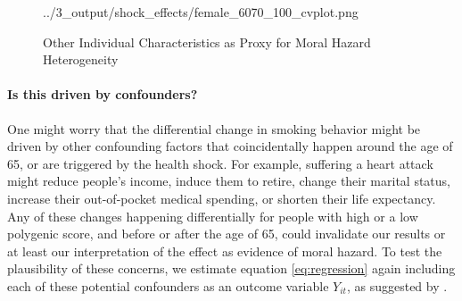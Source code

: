 \documentclass[11pt]{article}
\begin{document}
\begin{figure}[ht]
\begin{center}
{		{../3_output/shock_effects/female_6070_100_cvplot.png}
		}
		\caption{Other Individual Characteristics as Proxy for Moral Hazard Heterogeneity
					\label{fig:otherX}}
	\vspace{-5ex}
	\end{center}
\end{figure}


\paragraph{Is this driven by confounders?}
One might worry that the differential change in smoking behavior might be driven by other confounding factors that coincidentally happen around the age of 65, or are triggered by the health shock.
For example, suffering a heart attack might reduce people's income, induce them to retire, change their marital status, increase their out-of-pocket medical spending, or shorten their life expectancy.
Any of these changes happening differentially for people with high or a low polygenic score, and before or after the age of 65, could invalidate our results or at least our interpretation of the effect as evidence of moral hazard.
To test the plausibility of these concerns, we estimate equation \ref{eq:regression} again including each of these potential confounders as an outcome variable $Y_{it}$, as suggested by \cite{Pei2018}.
\end{document}
